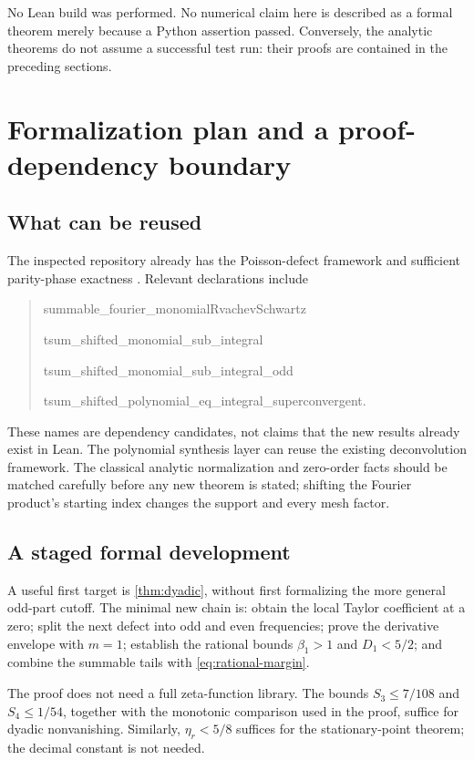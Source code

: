 \documentclass[11pt,a4paper]{article}
\numberwithin{equation}{section}
\theoremstyle{plain}
\theoremstyle{definition}
\theoremstyle{remark}
\begin{document}
No Lean build was performed. No numerical claim here is described as a
formal theorem merely because a Python assertion passed. Conversely, the
analytic theorems do not assume a successful test run: their proofs are
contained in the preceding sections.

\section{Formalization plan and a proof-dependency boundary}
\label{sec:formalization}

\subsection{What can be reused}

The inspected repository already has the Poisson-defect framework and
sufficient parity-phase exactness \cite{repo-defect,repo-lean}. Relevant declarations include
\begin{quote}\small\ttfamily
summable\_fourier\_monomialRvachevSchwartz\par\medskip
tsum\_shifted\_monomial\_sub\_integral\par\medskip
tsum\_shifted\_monomial\_sub\_integral\_odd\par\medskip
tsum\_shifted\_polynomial\_eq\_integral\_superconvergent.
\end{quote}
These names are dependency candidates, not claims that the new results
already exist in Lean. The polynomial synthesis layer can reuse the
existing deconvolution framework. The classical analytic normalization and
zero-order facts should be matched carefully before any new theorem is
stated; shifting the Fourier product's starting index changes the support
and every mesh factor.

\subsection{A staged formal development}

A useful first target is \cref{thm:dyadic}, without first formalizing the
more general odd-part cutoff. The minimal new chain is: obtain the local
Taylor coefficient at a zero; split the next defect into odd and even
frequencies; prove the derivative envelope with $m=1$; establish the
rational bounds $\beta_1>1$ and $D_1<5/2$; and combine the summable tails
with \eqref{eq:rational-margin}.

The proof does not need a full zeta-function library. The bounds
$S_3\le7/108$ and $S_4\le1/54$, together with the monotonic comparison
used in the proof, suffice for dyadic nonvanishing. Similarly,
$\eta_r<5/8$ suffices for the stationary-point theorem; the decimal
constant is not needed.
\end{document}
